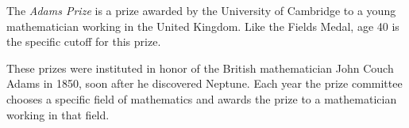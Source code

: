 \documentclass[12pt]{article}
\begin{document}
The {\em Adams Prize} is a prize awarded by the University of Cambridge to a young mathematician working in the United Kingdom. Like the Fields Medal, age 40 is the specific cutoff for this prize.

These prizes were instituted in honor of the British mathematician John Couch Adams in 1850, soon after he discovered Neptune. Each year the prize committee chooses a specific field of mathematics and awards the prize to a mathematician working in that field.
\end{document}
